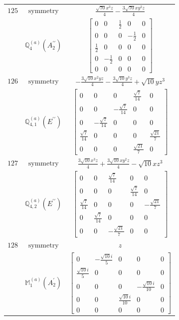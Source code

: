 \documentclass[fleqn,8pt,landscape]{jsarticle}
\begin{document}
\begin{longtable}{ccc}
$ 125 $ & $ \text{symmetry} $ & $ \frac{\sqrt{70} x^{3} z}{4} - \frac{3 \sqrt{70} x y^{2} z}{4} $ \\
$  $ & $ \mathbb{Q}_{4}^{(a)}(A_{2}^{\prime\prime}) $ & $ \begin{bmatrix} 0 & 0 & \frac{1}{2} & 0 & 0 \\ 0 & 0 & 0 & - \frac{1}{2} & 0 \\ \frac{1}{2} & 0 & 0 & 0 & 0 \\ 0 & - \frac{1}{2} & 0 & 0 & 0 \\ 0 & 0 & 0 & 0 & 0 \end{bmatrix} $ \\ \hline
$ 126 $ & $ \text{symmetry} $ & $ - \frac{3 \sqrt{10} x^{2} y z}{4} - \frac{3 \sqrt{10} y^{3} z}{4} + \sqrt{10} y z^{3} $ \\
$  $ & $ \mathbb{Q}_{4,1}^{(a)}(E^{\prime\prime}) $ & $ \begin{bmatrix} 0 & 0 & 0 & \frac{\sqrt{7}}{14} & 0 \\ 0 & 0 & - \frac{\sqrt{7}}{14} & 0 & 0 \\ 0 & - \frac{\sqrt{7}}{14} & 0 & 0 & 0 \\ \frac{\sqrt{7}}{14} & 0 & 0 & 0 & \frac{\sqrt{21}}{7} \\ 0 & 0 & 0 & \frac{\sqrt{21}}{7} & 0 \end{bmatrix} $ \\ \hline
$ 127 $ & $ \text{symmetry} $ & $ \frac{3 \sqrt{10} x^{3} z}{4} + \frac{3 \sqrt{10} x y^{2} z}{4} - \sqrt{10} x z^{3} $ \\
$  $ & $ \mathbb{Q}_{4,2}^{(a)}(E^{\prime\prime}) $ & $ \begin{bmatrix} 0 & 0 & \frac{\sqrt{7}}{14} & 0 & 0 \\ 0 & 0 & 0 & \frac{\sqrt{7}}{14} & 0 \\ \frac{\sqrt{7}}{14} & 0 & 0 & 0 & - \frac{\sqrt{21}}{7} \\ 0 & \frac{\sqrt{7}}{14} & 0 & 0 & 0 \\ 0 & 0 & - \frac{\sqrt{21}}{7} & 0 & 0 \end{bmatrix} $ \\ \hline
$ 128 $ & $ \text{symmetry} $ & $ z $ \\
$  $ & $ \mathbb{M}_{1}^{(a)}(A_{2}^{\prime}) $ & $ \begin{bmatrix} 0 & - \frac{\sqrt{10} i}{5} & 0 & 0 & 0 \\ \frac{\sqrt{10} i}{5} & 0 & 0 & 0 & 0 \\ 0 & 0 & 0 & - \frac{\sqrt{10} i}{10} & 0 \\ 0 & 0 & \frac{\sqrt{10} i}{10} & 0 & 0 \\ 0 & 0 & 0 & 0 & 0 \end{bmatrix} $ \\ \hline

\end{longtable}
\end{document}

